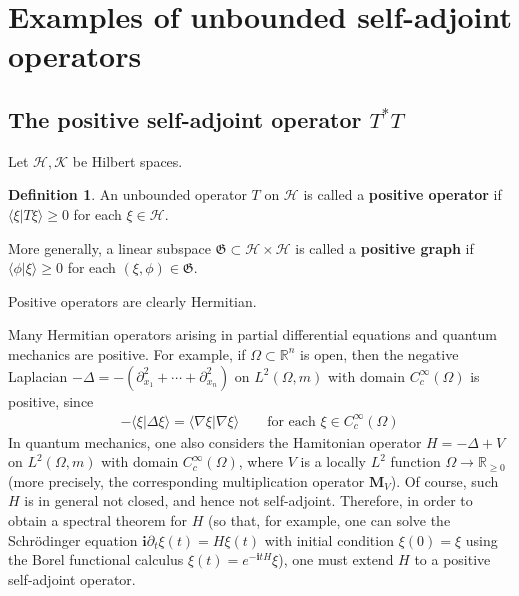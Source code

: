 \documentclass[12pt,b5paper,notitlepage]{article}
\theoremstyle{definition}
\newtheorem{df}{Definition}[subsection]
\theoremstyle{plain}
\newcommand{\fk}{\mathfrak}
\newcommand{\bk}[1]{\langle {#1}\rangle}
\newcommand{\im}{\mathbf{i}}
\newcommand{\Rbb}{\mathbb R}
\newcommand{\MH}{\mathcal H}
\newcommand{\MK}{\mathcal K}
\newcommand{\Mbf}{\mathbf M}
\newcommand{\hqed}{\hfill\qedsymbol}
\numberwithin{equation}{section}
\begin{document}
\newpage


\section{Examples of unbounded self-adjoint operators}\label{lb407}




\subsection{The positive self-adjoint operator $T^*T$}



Let $\MH,\MK$ be Hilbert spaces.




\begin{df}
An unbounded operator $T$ on $\MH$ is called a \textbf{positive operator}  if $\bk{\xi|T\xi}\geq0$ for each $\xi\in\MH$. 

More generally, a linear subspace $\fk G\subset\MH\times\MH$ is called a \textbf{positive graph}  if $\bk{\phi|\xi}\geq0$ for each $(\xi,\phi)\in\fk G$.  \hqed
\end{df}

Positive operators are clearly Hermitian.



Many Hermitian operators arising in partial differential equations and quantum mechanics are positive. For example, if $\Omega\subset\Rbb^n$ is open, then the negative Laplacian $-\Delta=-(\partial_{x_1}^2+\cdots+\partial_{x_n}^2)$ on $L^2(\Omega,m)$ with domain $C_c^\infty(\Omega)$ is positive, since
\begin{align}
-\bk{\xi|\Delta\xi}=\bk{\nabla\xi|\nabla\xi}\qquad\text{for each }\xi\in C_c^\infty(\Omega)
\end{align}
In quantum mechanics, one also considers the Hamitonian operator $H=-\Delta+V$ on $L^2(\Omega,m)$ with domain $C_c^\infty(\Omega)$, where $V$ is a locally $L^2$ function $\Omega\rightarrow\Rbb_{\geq0}$ (more precisely, the corresponding multiplication operator $\Mbf_V$). Of course, such $H$ is in general not closed, and hence not self-adjoint. Therefore, in order to obtain a spectral theorem for $H$ (so that, for example, one can solve the Schr\"odinger equation $\im\partial_t\xi(t)=H\xi(t)$ with initial condition $\xi(0)=\xi$ using the Borel functional calculus $\xi(t)=e^{-\im tH}\xi$), one must extend $H$ to a positive self-adjoint operator.
\end{document}
